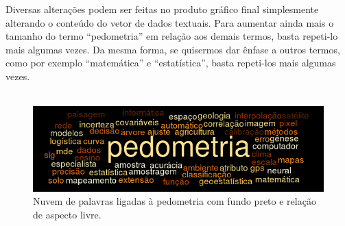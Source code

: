 \noindent Diversas alterações podem ser feitas no produto gráfico final simplesmente alterando o conteúdo do vetor de dados textuais. Para aumentar ainda mais o tamanho do termo ``pedometria'' em relação aos demais termos, basta repeti-lo mais algumas vezes. Da mesma forma, se quisermos dar ênfase a outros termos, como por exemplo ``matemática'' e ``estatística'', basta repeti-los mais algumas vezes.\\
\\
\begin{figure}[htbp]
   \centering
   \includegraphics[scale=0.8]{figuras/wordcloud-black}
   \caption{Nuvem de palavras ligadas à pedometria com fundo preto e relação de aspecto livre.}
   \label{fig:wordcloud-black}
\end{figure}
